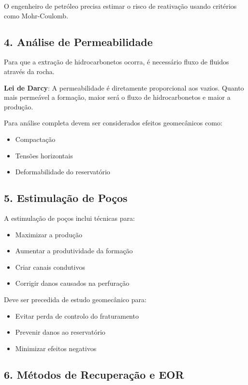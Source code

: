 \documentclass[12pt,a4paper,twoside]{book}
\begin{document}
O engenheiro de petróleo precisa estimar o risco de reativação usando critérios como Mohr-Coulomb.

\subsection{4. Análise de Permeabilidade}

Para que a extração de hidrocarbonetos ocorra, é necessário fluxo de fluidos através da rocha.

\textbf{Lei de Darcy}: A permeabilidade é diretamente proporcional aos vazios. Quanto mais permeável 
a formação, maior será o fluxo de hidrocarbonetos e maior a produção.

Para análise completa devem ser considerados efeitos geomecânicos como:
\begin{itemize}
    \item Compactação
    \item Tensões horizontais
    \item Deformabilidade do reservatório
\end{itemize}

\subsection{5. Estimulação de Poços}

A estimulação de poços inclui técnicas para:
\begin{itemize}
    \item Maximizar a produção
    \item Aumentar a produtividade da formação
    \item Criar canais condutivos
    \item Corrigir danos causados na perfuração
\end{itemize}

Deve ser precedida de estudo geomecânico para:
\begin{itemize}
    \item Evitar perda de controlo do fraturamento
    \item Prevenir danos ao reservatório
    \item Minimizar efeitos negativos
\end{itemize}

\subsection{6. Métodos de Recuperação e EOR}
\end{document}
